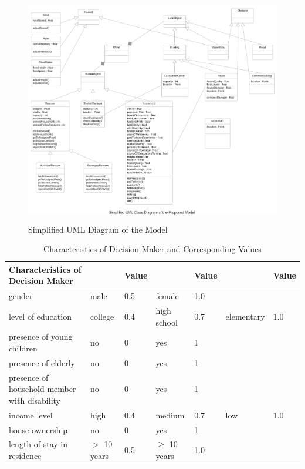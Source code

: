 \documentclass[runningheads]{llncs}
\begin{document}
\begin{figure}[!ht]
    \centering
    \includegraphics[width=\textwidth,height=10cm]{uml-abm.png}
	\caption{Simplified UML Diagram of the Model}
	\label{fig:simplified_uml}
\end{figure}


\begin{table}[htb]
\begin{center}
\caption{Characteristics of Decision Maker and Corresponding Values}
{\small
\hfill{}
\begin{tabular}{|p{5cm}|p{1.5cm}|p{1cm}|p{1.5cm}|p{1cm}|p{1.5cm}|p{1cm}|}
\hline
Characteristics of Decision Maker & & Value & & Value & & Value \\
\hline
gender & male & 0.5 & female & 1.0 & & \\
level of education & college & 0.4 & high school & 0.7 & elementary & 1.0 \\
presence of young children & no & 0 & yes & 1 & & \\
presence of elderly & no & 0 & yes & 1 & & \\
presence of household member with disability & no & 0 & yes & 1 & & \\
income level & high & 0.4 & medium & 0.7 & low & 1.0 \\
house ownership & no & 0 & yes & 1 & & \\
length of stay in residence & $>$ 10 years & 0.5 & $\geq$ 10 years & 1.0 & & \\
\hline
\end{tabular}}
\hfill{}
\label{keynodes_a}
\end{center}
\end{table}
\end{document}
